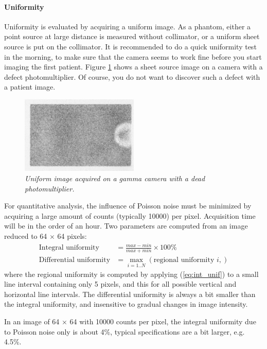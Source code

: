 \documentclass[11pt,oneside]{article}
\begin{document}
\paragraph{Uniformity}
Uniformity is evaluated by acquiring a uniform image. As a phantom, either
a point source at large distance is measured without collimator, or a
uniform sheet source is put on the collimator. It is recommended to do a quick
uniformity test in the morning, to make sure that the camera seems to work
fine before you start imaging the first patient. Figure \ref{fig:qc_pmt} shows
a sheet source image on a camera with a defect photomultiplier. Of course, you
do not want to discover such a defect with a patient image.
%
\begin{figure}[tb]
\centering
\includegraphics[width=0.5\textwidth]{figs/fig_qc_pmt.pdf}
\caption{\label{fig:qc_pmt} \emph{Uniform image acquired on a gamma camera
with a dead photomultiplier.}}
\end{figure}

For quantitative analysis, the influence of Poisson noise must be minimized by
acquiring a large amount of counts (typically 10000) per pixel. Acquisition
time will be in the order of an hour. Two parameters are computed from an
image reduced to 64 $\times$ 64 pixels:
\begin{align}
 \mbox{Integral uniformity} &= \frac{max - min}{max + min} \times 100 \%
      \label{eq:int_unif}\\
 \mbox{Differential uniformity} &= \max_{i=1..N} \left( \mbox{regional
 uniformity $i$}, \right)
\end{align}
where the regional uniformity is computed by applying (\ref{eq:int_unif}) to a
small line interval containing only 5 pixels, and this for all possible
vertical and horizontal line intervals. The differential uniformity is always
a bit smaller than the integral uniformity, and insensitive to gradual changes
in image intensity.

In an image of 64 $\times$ 64 with 10000 counts per pixel, the integral
uniformity due to Poisson noise only is about 4\%, typical specifications are
a bit larger, e.g. 4.5\%.
\end{document}
